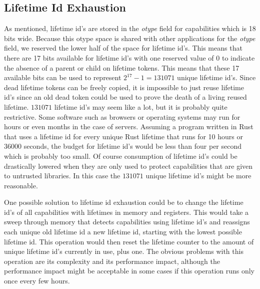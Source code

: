 \subsection{Lifetime Id Exhaustion}
As mentioned, lifetime id's are stored in the \textit{otype} field for capabilities which is 18 bits wide.
Because this otype space is shared with other applications for the \textit{otype} field, we reserved the lower half of the space for lifetime id's.
This means that there are 17 bits available for lifetime id's with one reserved value of 0 to indicate the absence of a parent or child on lifetime tokens.
This means that these 17 available bits can be used to represent $2^{17} - 1 = 131071$ unique lifetime id's.
Since dead lifetime tokens can be freely copied, it is impossible to just reuse lifetime id's since an old dead token could be used to prove the death of a living reused lifetime.
$131071$ lifetime id's may seem like a lot, but it is probably quite restrictive.
Some software such as browsers or operating systems may run for hours or even months in the case of servers.
Assuming a program written in Rust that uses a lifetime id for every unique Rust lifetime that runs for 10 hours or 36000 seconds, the budget for lifetime id's would be less than four per second which is probably too small.
Of course consumption of lifetime id's could be drastically lowered when they are only used to protect capabilities that are given to untrusted libraries.
In this case the $131071$ unique lifetime id's might be more reasonable.

One possible solution to lifetime id exhaustion could be to change the lifetime id's of all capabilities with lifetimes in memory and registers.
This would take a sweep through memory that detects capabilities using lifetime id's and reassigns each unique old lifetime id a new lifetime id, starting with the lowest possible lifetime id.
This operation would then reset the lifetime counter to the amount of unique lifetime id's currently in use, plus one.
The obvious problems with this operation are its complexity and its performance impact, although the performance impact might be acceptable in some cases if this operation runs only once every few hours.

